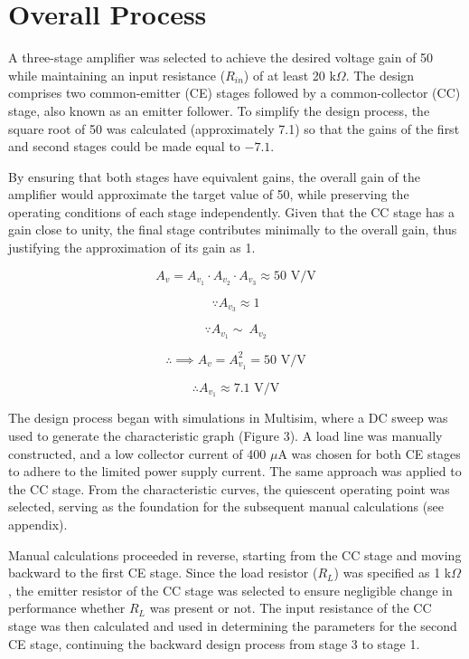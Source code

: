 
\section{Overall Process}

{A three-stage amplifier was selected to achieve the desired voltage gain of 50 while maintaining an input resistance (\(R_{in}\)) of at least 20 k\(\Omega\). The design comprises two common-emitter (CE) stages followed by a common-collector (CC) stage, also known as an emitter follower. To simplify the design process, the square root of 50 was calculated (approximately 7.1) so that the gains of the first and second stages could be made equal to \(-7.1\).}

{By ensuring that both stages have equivalent gains, the overall gain of the amplifier would approximate the target value of 50, while preserving the operating conditions of each stage independently. Given that the CC stage has a gain close to unity, the final stage contributes minimally to the overall gain, thus justifying the approximation of its gain as 1.}

	$$A_v = A_v_1 \cdot A_v_2 \cdot A_v_3 \approx 50 \text{ V/V}$$
	
	$$\because A_v_3 \approx 1$$ 
	
	$$\because A_v_1 \sim \ A_v_2$$
	
	$$\therefore \implies A_v = A_{v_1}^2 = 50 \text{ V/V}$$
	
	$$\therefore A_{v_1} \approx 7.1 \text{ V/V}$$

{The design process began with simulations in Multisim, where a DC sweep was used to generate the characteristic graph (Figure 3). A load line was manually constructed, and a low collector current of 400 \(\mu\)A was chosen for both CE stages to adhere to the limited power supply current. The same approach was applied to the CC stage. From the characteristic curves, the quiescent operating point was selected, serving as the foundation for the subsequent manual calculations (see appendix).}

{Manual calculations proceeded in reverse, starting from the CC stage and moving backward to the first CE stage. Since the load resistor (\(R_L\)) was specified as 1 k\(\Omega\), the emitter resistor of the CC stage was selected to ensure negligible change in performance whether \(R_L\) was present or not. The input resistance of the CC stage was then calculated and used in determining the parameters for the second CE stage, continuing the backward design process from stage 3 to stage 1.}

